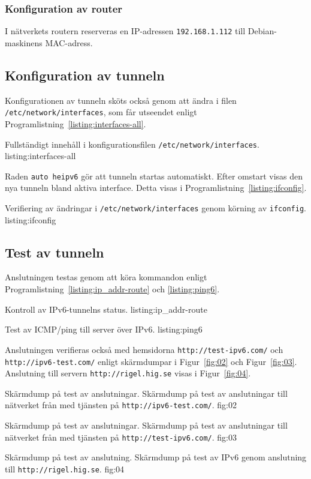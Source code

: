 \subsubsection{Konfiguration av router}
I nätverkets routern reserveras en IP-adressen \texttt{192.168.1.112} till
Debian-maskinens MAC-adress.


\subsection{Konfiguration av tunneln}
Konfigurationen av tunneln sköts också genom att ändra i filen
\texttt{/etc/network/interfaces}, som får utseendet enligt
Programlistning~\ref{listing:interfaces-all}.

            {Fullständigt innehåll i konfigurationsfilen \texttt{/etc/network/interfaces}.}
            {listing:interfaces-all}


Raden \texttt{auto heipv6} gör att tunneln startas automatiskt.
Efter omstart visas den nya tunneln bland aktiva interface. Detta visas i  
Programlistning~\ref{listing:ifconfig}.

            {Verifiering av ändringar i \texttt{/etc/network/interfaces}
             genom körning av \texttt{ifconfig}.}
            {listing:ifconfig}

\subsection{Test av tunneln}
Anslutningen testas genom att köra kommandon enligt 
Programlistning~\ref{listing:ip_addr-route} och \ref{listing:ping6}.

            {Kontroll av IPv6-tunnelns status.}
            {listing:ip_addr-route}

            {Test av ICMP/ping till server över IPv6.}
            {listing:ping6}

Anslutningen verifieras också med hemsidorna \texttt{http://test-ipv6.com/}
och \texttt{http://ipv6-test.com/} enligt skärmdumpar i Figur~\ref{fig:02}
och Figur~\ref{fig:03}.
Anslutning till servern \texttt{http://rigel.hig.se} visas i Figur~\ref{fig:04}.

           {Skärmdump på test av anslutningar.}
           {Skärmdump på test av anslutningar till nätverket från med tjänsten
            på \texttt{http://ipv6-test.com/}.}
           {fig:02}

           {Skärmdump på test av anslutningar.}
           {Skärmdump på test av anslutningar till nätverket från med tjänsten
            på \texttt{http://test-ipv6.com/}.}
           {fig:03}

           {Skärmdump på test av anslutning.}
           {Skärmdump på test av IPv6 genom anslutning till
            \texttt{http://rigel.hig.se}.}
           {fig:04}

